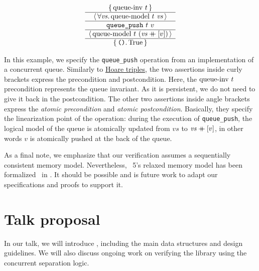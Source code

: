 \documentclass[a4paper, 11pt]{article}
\begin{document}
\[
  \begin{array}{c} \left\lbrace\, 
    \mathrm{queue {\hbox{-}} inv}\ t
   \,\right\rbrace \\ \hline \left\langle\, \forall 
    \mathit{vs}
   \ldotp 
    \mathrm{queue {\hbox{-}} model}\ t\  \mathit{vs}
   \,\right\rangle \\ \hline 
    \texttt{queue\_push}\ t\ v
   \\ \hline \left\langle\, 
    \mathrm{queue {\hbox{-}} model}\ t\  (\mathit{vs} \mathbin{+\mkern-10mu+} [v])
   \,\right\rangle \\ \hline \left\lbrace\, 
    \texttt{()}
   \ldotp 
    \mathrm{True}
   \,\right\rbrace \end{array}
\]

In this example, we specify the \texttt{queue\_push} operation from an implementation of a concurrent queue.
Similarly to \href{https://en.wikipedia.org/wiki/Hoare_logic}{Hoare triples}, the two assertions inside curly brackets express the precondition and postcondition.
Here, the $\mathrm{queue {\hbox{-}} inv}\ t$ precondition represents the queue invariant.
As it is persistent, we do not need to give it back in the postcondition.
The other two assertions inside angle brackets express the \emph{atomic precondition} and \emph{atomic postcondition}.
Basically, they specify the linearization point of the operation: during the execution of \texttt{queue\_push}, the logical model of the queue is atomically updated from $\mathit{vs}$ to $\mathit{vs} \mathbin{+\mkern-10mu+} [v]$, in other words $v$ is atomically pushed at the back of the queue.

As a final note, we emphasize that our verification assumes a sequentially consistent memory model.
Nevertheless, \OCaml~5's relaxed memory model has been formalized~\cite{DBLP:journals/pacmpl/MevelJP20} in \Iris.
It should be possible and is future work to adapt our specifications and proofs to support it.

\section{Talk proposal}

In our talk, we will introduce \Saturn, including the main data structures and design guidelines.
We will also discuss ongoing work on verifying the library using the \Iris concurrent separation logic.

%
%

\printbibliography
\end{document}
